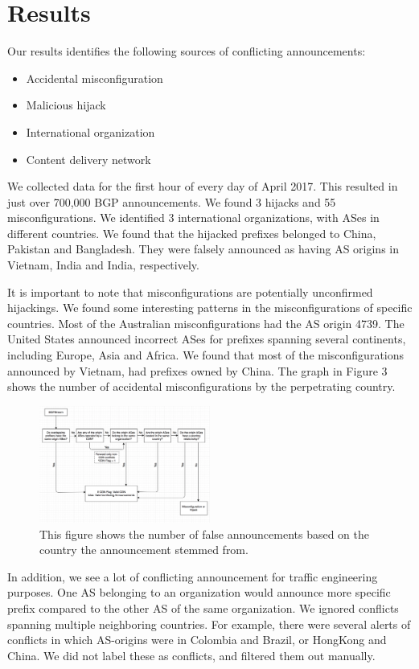  \section{Results}\label{sec:results}
 
Our results identifies the following sources of conflicting announcements:
\begin{itemize}
\item Accidental misconfiguration
\item Malicious hijack
\item International organization
\item Content delivery network
\end{itemize}

We collected data for the first hour of every day of April 2017. This resulted in just over 700,000 BGP announcements. We found 3 hijacks and 55 misconfigurations. We identified 3 international organizations, with ASes in different countries. We found that the hijacked prefixes belonged to China, Pakistan and Bangladesh. They were falsely announced as having AS origins in Vietnam, India and India, respectively.

It is important to note that misconfigurations are potentially unconfirmed hijackings. We found some interesting patterns in the misconfigurations of specific countries. Most of the Australian misconfigurations had the AS origin 4739. The United States announced incorrect ASes for prefixes spanning several continents, including Europe, Asia and Africa. We found that most of the misconfigurations announced by Vietnam, had prefixes owned by China. The graph in Figure 3 shows the number of accidental misconfigurations by the perpetrating country.

 \begin{figure}[!htbp]
	\includegraphics[width=0.5\textwidth]{flow.png}
	\caption{This figure shows the number of false announcements based on the country the announcement stemmed from.}
	\label{a:label}
\end{figure}

In addition, we see a lot of conflicting announcement for traffic engineering purposes. One AS belonging to an organization would announce more specific prefix compared to the other AS of the same organization. We ignored conflicts spanning multiple neighboring countries. For example, there were several alerts of conflicts in which AS-origins were in Colombia and Brazil, or HongKong and China. We did not label these as conflicts, and filtered them out manually.
